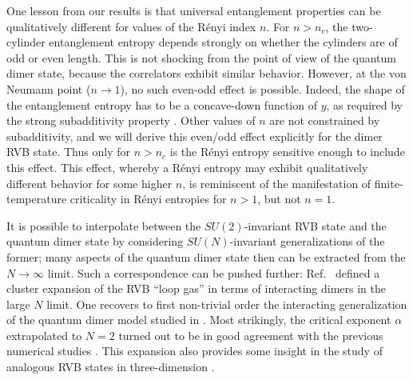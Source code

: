 \documentclass[11pt]{iopart}
\begin{document}
One lesson from our results is that universal entanglement properties can be qualitatively different for values of the R\'enyi index $n$. For $n>n_c$, the two-cylinder entanglement entropy depends strongly on whether the cylinders are of odd or even length. This is not shocking from the point of view of the quantum dimer state, because the correlators exhibit similar behavior. However, at the von Neumann point ($n\to 1$), no such even-odd effect is possible. Indeed, the shape of the entanglement entropy has to be a concave-down function of $y$, as required by the strong subadditivity property \cite{Strongsubadditivity}. Other values of $n$ are not constrained by subadditivity, and we will derive this even/odd effect explicitly for the dimer RVB state. 
Thus only for $n>n_c$ is the R\'enyi entropy sensitive enough to include this effect. 
This effect, whereby a R\'enyi entropy may exhibit qualitatively different behavior for some higher $n$, is reminiscent of the manifestation of finite-temperature criticality in R\'enyi entropies for $n>1$, but not $n=1$\cite{RenyiXing}. 

It is possible to interpolate between the $SU(2)$-invariant RVB state and the quantum dimer state by considering $SU(N)$-invariant generalizations of the former; many aspects of the quantum dimer state then can be extracted from the $N\to\infty$ limit. Such a correspondence can be pushed further: Ref.~\cite{Damle} defined a cluster expansion of the RVB ``loop gas''\cite{Sutherland_loops} in terms of interacting dimers in the large $N$ limit. One recovers to first non-trivial order the interacting generalization of the quantum dimer model studied in \cite{Alet_dimers1,Alet_dimers2}. Most strikingly, the critical exponent $\alpha$ extrapolated to $N=2$ turned out to be in good agreement with the previous numerical studies \cite{RVB1,RVB2}. This expansion also provides some insight in the study of analogous RVB states in three-dimension \cite{AAM,AMPMJ}.

\end{document}
